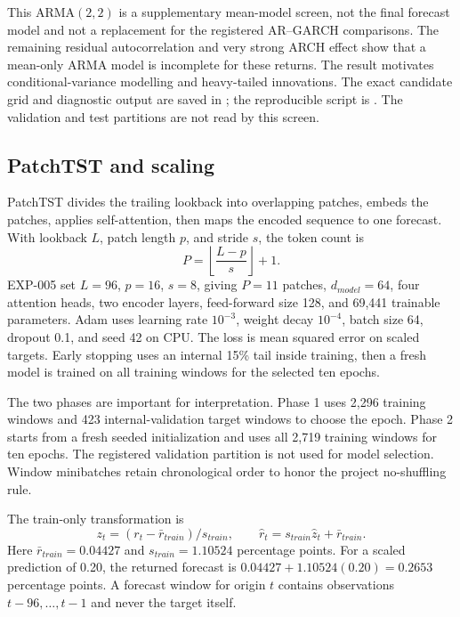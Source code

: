 \documentclass[11pt,a4paper]{article}
\begin{document}
This ARMA$(2,2)$ is a supplementary mean-model screen, not the final forecast model and not a
replacement for the registered AR--GARCH comparisons. The remaining residual autocorrelation and
very strong ARCH effect show that a mean-only ARMA model is incomplete for these returns. The
result motivates conditional-variance modelling and heavy-tailed innovations. The exact candidate
grid and diagnostic output are saved in
; the reproducible script is
. The validation and test partitions are not read by this
screen.

\subsection{PatchTST and scaling}
PatchTST divides the trailing lookback into overlapping patches, embeds the patches, applies
self-attention, then maps the encoded sequence to one forecast. With lookback $L$, patch length
$p$, and stride $s$, the token count is
\begin{equation}
 P=\left\lfloor\frac{L-p}{s}\right\rfloor+1.
\end{equation}
EXP-005 set $L=96$, $p=16$, $s=8$, giving $P=11$ patches, $d_{model}=64$, four attention
heads, two encoder layers, feed-forward size 128, and 69,441 trainable parameters. Adam uses
learning rate $10^{-3}$, weight decay $10^{-4}$, batch size 64, dropout 0.1, and seed 42 on CPU.
The loss is mean squared error on scaled targets. Early stopping uses an internal 15\% tail
inside training, then a fresh model is trained on all training windows for the selected ten epochs.

The two phases are important for interpretation. Phase 1 uses 2,296 training windows and 423
internal-validation target windows to choose the epoch. Phase 2 starts from a fresh seeded
initialization and uses all 2,719 training windows for ten epochs. The registered validation
partition is not used for model selection. Window minibatches retain chronological order to
honor the project no-shuffling rule.

The train-only transformation is
\[
 z_t=(r_t-\bar r_{train})/s_{train},\qquad
 \hat r_t=s_{train}\hat z_t+\bar r_{train}.
\]
Here $\bar r_{train}=0.04427$ and $s_{train}=1.10524$ percentage points. For a scaled prediction
of 0.20, the returned forecast is $0.04427+1.10524(0.20)=0.2653$ percentage points. A forecast
window for origin $t$ contains observations $t-96,\ldots,t-1$ and never the target itself.
\end{document}
